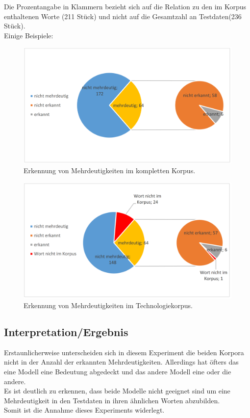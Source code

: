 \documentclass[12pt,a4paper]{report}
\begin{document}
		Die Prozentangabe in Klammern bezieht sich auf die Relation zu den im Korpus enthaltenen Worte (211 Stück) und nicht auf die Gesamtzahl an Testdaten(236 Stück).\\
		
Einige Beispiele:\\

		
		\begin{figure}[p]
  \begin{center}
	\includegraphics[scale=0.4]{MehrdeutigkeitFull.PNG}
  \end{center}  
  \caption{Erkennung von Mehrdeutigkeiten im kompletten Korpus.}

\end{figure}
\begin{figure}[p]
  \begin{center}
	\includegraphics[scale=0.4]{MehrdeutigkeitTech.PNG}
  \end{center}  
  \caption{Erkennung von Mehrdeutigkeiten im Technologiekorpus.}
  \end{figure}	
  
		
		\subsection{Interpretation/Ergebnis}
		Erstaunlicherweise unterscheiden sich in diesem Experiment die beiden Korpora nicht in der Anzahl der erkannten Mehrdeutigkeiten. Allerdings hat öfters das eine Modell eine Bedeutung abgedeckt und das andere Modell eine oder die andere.\\
		Es ist deutlich zu erkennen, dass beide Modelle nicht geeignet sind um eine Mehrdeutigkeit in den Testdaten in ihren ähnlichen Worten abzubilden.\\
		Somit ist die Annahme dieses Experiments widerlegt.
		
\end{document}
